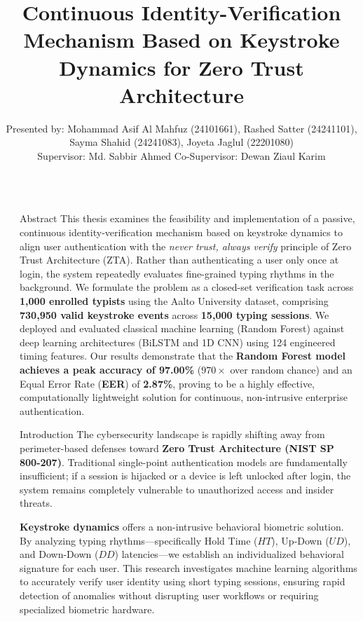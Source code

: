 \documentclass[final]{beamer}
\title{Continuous Identity-Verification Mechanism Based on Keystroke Dynamics for Zero Trust Architecture}
\author{Presented by: Mohammad Asif Al Mahfuz (24101661), Rashed Satter (24241101), Sayma Shahid (24241083), Joyeta Jaglul (22201080) \\[0.6ex]
Supervisor: Md. Sabbir Ahmed \qquad Co-Supervisor: Dewan Ziaul Karim}
\institute[shortinst]{BRAC University}
\newlength{\sepwidth}
\newlength{\colwidth}
\newcommand{\separatorcolumn}{\begin{column}{\sepwidth}\end{column}}
\begin{document}
\begin{frame}[t]
\begin{columns}[t]
\separatorcolumn

\begin{column}{\colwidth}

  \begin{block}{Abstract}
    This thesis examines the feasibility and implementation of a passive, continuous identity-verification mechanism based on keystroke dynamics to align user authentication with the \emph{never trust, always verify} principle of Zero Trust Architecture (ZTA). Rather than authenticating a user only once at login, the system repeatedly evaluates fine-grained typing rhythms in the background. We formulate the problem as a closed-set verification task across \textbf{1{,}000 enrolled typists} using the Aalto University dataset, comprising \textbf{730{,}950 valid keystroke events} across \textbf{15{,}000 typing sessions}. We deployed and evaluated classical machine learning (Random Forest) against deep learning architectures (BiLSTM and 1D CNN) using 124 engineered timing features. Our results demonstrate that the \textbf{Random Forest model achieves a peak accuracy of 97.00\%} ($970\times$ over random chance) and an Equal Error Rate (\textbf{EER}) of \textbf{2.87\%}, proving to be a highly effective, computationally lightweight solution for continuous, non-intrusive enterprise authentication.
  \end{block}

  \begin{block}{Introduction}
    The cybersecurity landscape is rapidly shifting away from perimeter-based defenses toward \textbf{Zero Trust Architecture (NIST SP 800-207)}. Traditional single-point authentication models are fundamentally insufficient; if a session is hijacked or a device is left unlocked after login, the system remains completely vulnerable to unauthorized access and insider threats.
    
    \vspace{0.3em}
    \textbf{Keystroke dynamics} offers a non-intrusive behavioral biometric solution. By analyzing typing rhythms—specifically Hold Time ($HT$), Up-Down ($UD$), and Down-Down ($DD$) latencies—we establish an individualized behavioral signature for each user. This research investigates machine learning algorithms to accurately verify user identity using short typing sessions, ensuring rapid detection of anomalies without disrupting user workflows or requiring specialized biometric hardware.
  \end{block}


\end{column}
\end{columns}
\end{frame}
\end{document}
